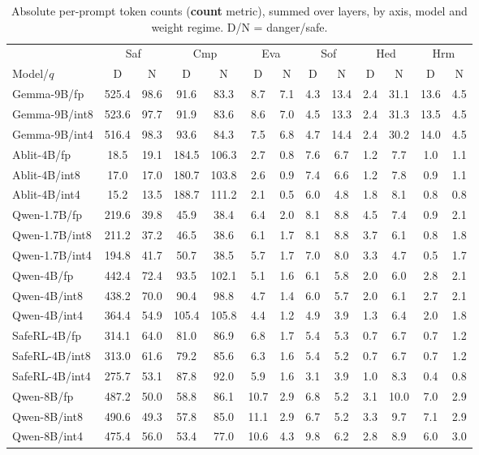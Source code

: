 \documentclass[10pt,twocolumn]{article}
\begin{document}
\begin{table}[p]
\centering\footnotesize
\setlength{\tabcolsep}{3.2pt}
\caption{Absolute per-prompt token counts (\textbf{count} metric), summed over layers, by
axis, model and weight regime. D/N = danger/safe.}
\label{tab:abs-count}
\begin{tabular}{@{}l*{12}{c}@{}}
\toprule
& \multicolumn{2}{c}{Saf} & \multicolumn{2}{c}{Cmp} & \multicolumn{2}{c}{Eva}
& \multicolumn{2}{c}{Sof} & \multicolumn{2}{c}{Hed} & \multicolumn{2}{c}{Hrm} \\
\cmidrule(lr){2-3}\cmidrule(lr){4-5}\cmidrule(lr){6-7}\cmidrule(lr){8-9}\cmidrule(lr){10-11}\cmidrule(lr){12-13}
Model/$q$ & D & N & D & N & D & N & D & N & D & N & D & N \\
\midrule
Gemma-9B/fp   & 525.4 & 98.6 &  91.6 &  83.3 & 8.7 & 7.1 & 4.3 & 13.4 & 2.4 & 31.1 & 13.6 & 4.5 \\
Gemma-9B/int8 & 523.6 & 97.7 &  91.9 &  83.6 & 8.6 & 7.0 & 4.5 & 13.3 & 2.4 & 31.3 & 13.5 & 4.5 \\
Gemma-9B/int4 & 516.4 & 98.3 &  93.6 &  84.3 & 7.5 & 6.8 & 4.7 & 14.4 & 2.4 & 30.2 & 14.0 & 4.5 \\
Ablit-4B/fp   &  18.5 & 19.1 & 184.5 & 106.3 & 2.7 & 0.8 & 7.6 &  6.7 & 1.2 &  7.7 &  1.0 & 1.1 \\
Ablit-4B/int8 &  17.0 & 17.0 & 180.7 & 103.8 & 2.6 & 0.9 & 7.4 &  6.6 & 1.2 &  7.8 &  0.9 & 1.1 \\
Ablit-4B/int4 &  15.2 & 13.5 & 188.7 & 111.2 & 2.1 & 0.5 & 6.0 &  4.8 & 1.8 &  8.1 &  0.8 & 0.8 \\
Qwen-1.7B/fp   & 219.6 & 39.8 & 45.9 & 38.4 & 6.4 & 2.0 & 8.1 & 8.8 & 4.5 & 7.4 & 0.9 & 2.1 \\
Qwen-1.7B/int8 & 211.2 & 37.2 & 46.5 & 38.6 & 6.1 & 1.7 & 8.1 & 8.8 & 3.7 & 6.1 & 0.8 & 1.8 \\
Qwen-1.7B/int4 & 194.8 & 41.7 & 50.7 & 38.5 & 5.7 & 1.7 & 7.0 & 8.0 & 3.3 & 4.7 & 0.5 & 1.7 \\
Qwen-4B/fp   & 442.4 & 72.4 &  93.5 & 102.1 & 5.1 & 1.6 & 6.1 & 5.8 & 2.0 & 6.0 & 2.8 & 2.1 \\
Qwen-4B/int8 & 438.2 & 70.0 &  90.4 &  98.8 & 4.7 & 1.4 & 6.0 & 5.7 & 2.0 & 6.1 & 2.7 & 2.1 \\
Qwen-4B/int4 & 364.4 & 54.9 & 105.4 & 105.8 & 4.4 & 1.2 & 4.9 & 3.9 & 1.3 & 6.4 & 2.0 & 1.8 \\
SafeRL-4B/fp   & 314.1 & 64.0 & 81.0 & 86.9 & 6.8 & 1.7 & 5.4 & 5.3 & 0.7 & 6.7 & 0.7 & 1.2 \\
SafeRL-4B/int8 & 313.0 & 61.6 & 79.2 & 85.6 & 6.3 & 1.6 & 5.4 & 5.2 & 0.7 & 6.7 & 0.7 & 1.2 \\
SafeRL-4B/int4 & 275.7 & 53.1 & 87.8 & 92.0 & 5.9 & 1.6 & 3.1 & 3.9 & 1.0 & 8.3 & 0.4 & 0.8 \\
Qwen-8B/fp   & 487.2 & 50.0 & 58.8 & 86.1 & 10.7 & 2.9 & 6.8 & 5.2 & 3.1 & 10.0 & 7.0 & 2.9 \\
Qwen-8B/int8 & 490.6 & 49.3 & 57.8 & 85.0 & 11.1 & 2.9 & 6.7 & 5.2 & 3.3 &  9.7 & 7.1 & 2.9 \\
Qwen-8B/int4 & 475.4 & 56.0 & 53.4 & 77.0 & 10.6 & 4.3 & 9.8 & 6.2 & 2.8 &  8.9 & 6.0 & 3.0 \\
\bottomrule
\end{tabular}
\end{table}
\end{document}
